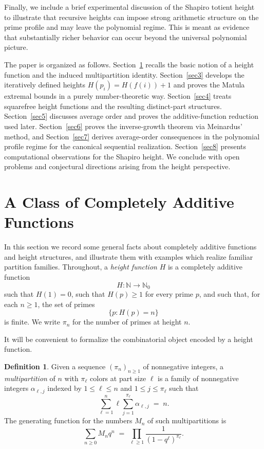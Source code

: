 \documentclass[11pt]{article}
\theoremstyle{definition}
\newtheorem{definition}{Definition}
\begin{document}
Finally, we include a brief experimental discussion of the Shapiro totient
height to illustrate that recursive heights can impose strong arithmetic
structure on the prime profile and may leave the polynomial regime.  This is
meant as evidence that substantially richer behavior can occur beyond the
universal polynomial picture.


The paper is organized as follows.
Section~\ref{sec2} recalls the basic notion of a height function and the induced
multipartition identity.
Section~\ref{sec3} develops the iteratively defined heights $H(p_i)=H(f(i))+1$
and proves the Matula extremal bounds in a purely number-theoretic way.
Section~\ref{sec4} treats squarefree height functions and the resulting
distinct-part structures.
Section~\ref{sec5} discusses average order and proves the additive-function
reduction used later.
Section~\ref{sec6} proves the inverse-growth theorem via Meinardus' method, and
Section~\ref{sec7} derives average-order consequences in the polynomial profile
regime for the canonical sequential realization.
Section~\ref{sec8} presents computational observations for the Shapiro height.
We conclude with open problems and conjectural directions arising from the
height perspective.

\section{A Class of Completely Additive Functions}\label{sec2}

In this section we record some general facts about completely additive
functions and height structures, and illustrate them with examples which realize
familiar partition families.  Throughout, a \emph{height function} $H$ is a
completely additive function
\[
  H:\mathbb{N}\to\mathbb{N}_0
\]
such that $H(1)=0$, such that $H(p)\ge1$ for every prime $p$, and such that, for
each $n\ge1$, the set of primes
\[
  \{p : H(p)=n\}
\]
is finite.  We write $\pi_n$ for the number of primes at height $n$.

It will be convenient to formalize the combinatorial object encoded by
a height function.

\begin{definition}\label{def1}
Given a sequence $(\pi_n)_{n\ge1}$ of nonnegative integers, a
\emph{multipartition} of $n$ with $\pi_\ell$ colors at part size
$\ell$ is a family of nonnegative integers
$\alpha_{\ell,j}$ indexed by $1\le\ell\le n$ and
$1\le j\le \pi_\ell$ such that
\[
  \sum_{\ell=1}^n \ell \sum_{j=1}^{\pi_\ell} \alpha_{\ell,j}
  \;=\; n.
\]
The generating function for the numbers $M_n$ of such multipartitions
is
\[
  \sum_{n\ge0} M_n q^n
  \;=\;
  \prod_{\ell\ge1} \frac{1}{(1-q^\ell)^{\pi_\ell}}.
\]
\end{definition}
\end{document}
